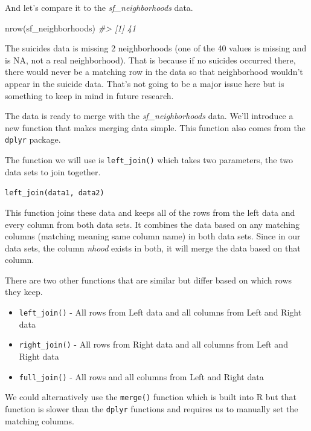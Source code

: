 \documentclass[
]{krantz}
\makeatletter
\newenvironment{Shaded}{\begin{snugshade}}{\end{snugshade}}
\newcommand{\CommentTok}[1]{\textcolor[rgb]{0.37,0.37,0.37}{\textit{#1}}}
\newcommand{\FunctionTok}[1]{\textcolor[rgb]{0,0,0}{#1}}
\newcommand{\NormalTok}[1]{#1}
\providecommand{\tightlist}{%
  \setlength{\itemsep}{0pt}\setlength{\parskip}{0pt}}
\newenvironment{kframe}{%
\medskip{}
\setlength{\fboxsep}{.8em}
 \def\at@end@of@kframe{}%
 \ifinner\ifhmode%
  \def\at@end@of@kframe{\end{minipage}}%
  \begin{minipage}{\columnwidth}%
 \fi\fi%
 \def\FrameCommand##1{\hskip\@totalleftmargin \hskip-\fboxsep
 \colorbox{shadecolor}{##1}\hskip-\fboxsep
     \hskip-\linewidth \hskip-\@totalleftmargin \hskip\columnwidth}%
 \MakeFramed {\advance\hsize-\width
   \@totalleftmargin\z@ \linewidth\hsize
   \@setminipage}}%
 {\par\unskip\endMakeFramed%
 \at@end@of@kframe}
\renewenvironment{Shaded}{\begin{kframe}}{\end{kframe}}
\makeatother
\begin{document}
And let's compare it to the \emph{sf\_neighborhoods} data.

\begin{Shaded}
\begin{Highlighting}[]
\FunctionTok{nrow}\NormalTok{(sf\_neighborhoods)}
\CommentTok{\#\textgreater{} [1] 41}
\end{Highlighting}
\end{Shaded}

The suicides data is missing 2 neighborhoods (one of the 40 values is missing and is NA, not a real neighborhood). That is because if no suicides occurred there, there would never be a matching row in the data so that neighborhood wouldn't appear in the suicide data. That's not going to be a major issue here but is something to keep in mind in future research.

The data is ready to merge with the \emph{sf\_neighborhoods} data. We'll introduce a new function that makes merging data simple. This function also comes from the \texttt{dplyr} package.

The function we will use is \texttt{left\_join()} which takes two parameters, the two data sets to join together.

\texttt{left\_join(data1,\ data2)}

This function joins these data and keeps all of the rows from the left data and every column from both data sets. It combines the data based on any matching columns (matching meaning same column name) in both data sets. Since in our data sets, the column \emph{nhood} exists in both, it will merge the data based on that column.

There are two other functions that are similar but differ based on which rows they keep.

\begin{itemize}
\tightlist
\item
  \texttt{left\_join()} - All rows from Left data and all columns from Left and Right data
\item
  \texttt{right\_join()} - All rows from Right data and all columns from Left and Right data
\item
  \texttt{full\_join()} - All rows and all columns from Left and Right data
\end{itemize}

We could alternatively use the \texttt{merge()} function which is built into R but that function is slower than the \texttt{dplyr} functions and requires us to manually set the matching columns.
\end{document}
